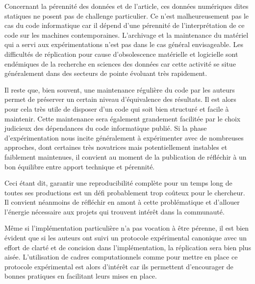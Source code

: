 Concernant la pérennité des données et de l'article, ces données numériques dites \og statiques \fg ne posent pas de challenge particulier. Ce n'est malheureusement pas le cas du code informatique car il dépend d'une pérennité de l'interprétation de ce code sur les machines contemporaines. L'archivage et la maintenance du matériel qui a servi aux expérimentations n'est pas dans le cas général envisageable. Les difficultés de réplication pour cause d'obsolescence matérielle et logicielle sont endémiques de la recherche en sciences des données car cette activité se situe généralement dans des secteurs de pointe évoluant très rapidement.

Il reste que, bien souvent, une maintenance régulière du code par les auteurs permet de préserver un certain niveau d'équivalence des résultats. Il est alors pour cela très utile de disposer d'un code qui soit bien structuré et facile à maintenir. Cette maintenance sera également grandement facilitée par le choix judicieux des dépendances du code informatique publié. Si la phase d'expérimentation nous incite généralement à expérimenter avec de nombreuses approches, dont certaines très novatrices mais potentiellement instables et faiblement maintenues, il convient au moment de la publication de réfléchir à un bon équilibre entre apport technique et pérennité.

Ceci étant dit, garantir une reproducibilité complète pour un temps long de toutes ses productions est un défi probablement trop coûteux pour le chercheur. Il convient néanmoins de réfléchir en amont à cette problématique et d'allouer l'énergie nécessaire aux projets qui trouvent intérêt dans la communauté.

Même si l'implémentation particulière n'a pas vocation à être pérenne, il est bien évident que si les auteurs ont suivi un protocole expérimental canonique avec un effort de clarté et de concision dans l'implémentation, la réplication sera bien plus aisée. L'utilisation de cadres computationnels comme \explanes pour mettre en place ce protocole expérimental est alors d'intérêt car ils permettent d'encourager de bonnes pratiques en facilitant leurs mises en place.

